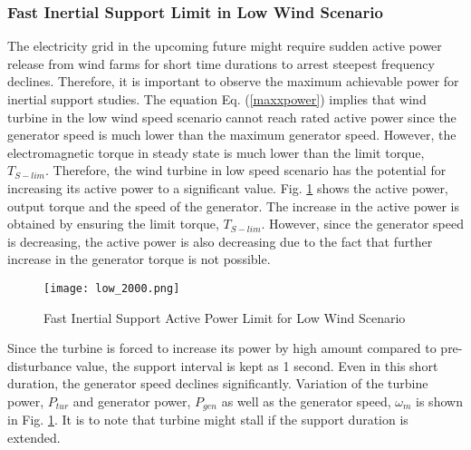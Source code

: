 \subsubsection{Fast Inertial Support Limit in Low Wind Scenario}
The electricity grid in the upcoming future might require sudden active power release from wind farms for short time durations to arrest steepest frequency declines. Therefore, it is important to observe the maximum achievable power for inertial support studies. The equation Eq. (\ref{maxxpower}) implies that wind turbine in the low wind speed scenario cannot reach rated active power since the generator speed is much lower than the maximum generator speed. However, the electromagnetic torque in steady state is much lower than the limit torque, $T_{S-lim}$. Therefore, the wind turbine in low speed scenario has the potential for increasing its active power to a significant value. Fig. \ref{low_limit_power} shows the active power, output torque and the speed of the generator. The increase in the active power is obtained by ensuring the limit torque, $T_{S-lim}$. However, since the generator speed is decreasing, the active power is also decreasing due to the fact that further increase in the generator torque is not possible. \par
\begin{figure}[h]
	\centering
	\texttt{[image: low\_2000.png]}
	\caption{Fast Inertial Support Active Power Limit for Low Wind Scenario}
	\label{low_limit_power}
\end{figure}
Since the turbine is forced to increase its power by high amount compared to pre-disturbance value, the support interval is kept as 1 second. Even in this short duration, the generator speed declines significantly. Variation of the turbine power, $P_{tur}$ and generator power, $P_{gen}$ as well as the generator speed, $\omega_{m}$ is shown in Fig. \ref{low_limit_power}. It is to note that turbine might stall if the support duration is extended. \par
